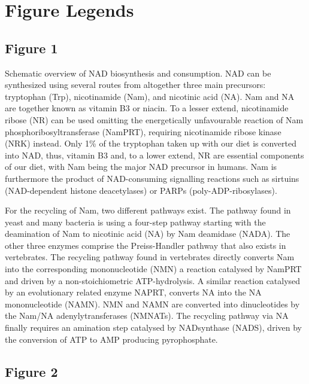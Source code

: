 
\section{Figure Legends}

\subsection{Figure 1}

Schematic overview of NAD biosynthesis and consumption. NAD can be synthesized using several routes from altogether three main precursors: tryptophan (Trp), nicotinamide (Nam), and nicotinic acid (NA). Nam and NA are together known as vitamin B3 or niacin. To a lesser extend, nicotinamide ribose (NR) can be used omitting the energetically unfavourable reaction of Nam phosphoribosyltransferase (NamPRT), requiring nicotinamide ribose kinase (NRK) instead. Only 1\% of the tryptophan taken up with our diet is converted into NAD, thus, vitamin B3 and, to a lower extend, NR are essential components of our diet, with Nam being the major NAD precursor in humans. Nam is furthermore the product of NAD-consuming signalling reactions such as sirtuins (NAD-dependent histone deacetylases) or PARPs (poly-ADP-ribosylases).

For the recycling of Nam, two different pathways exist. The pathway found in yeast and many bacteria is using a four-step pathway starting with the deamination of Nam to nicotinic acid (NA) by Nam deamidase (NADA). The other three enzymes comprise the Preiss-Handler pathway that also exists in vertebrates. The recycling pathway found in vertebrates directly converts Nam into the corresponding mononucleotide (NMN) a reaction catalysed by NamPRT and driven by a non-stoichiometric ATP-hydrolysis. A similar reaction catalysed by an evolutionary related enzyme NAPRT, converts NA into the NA mononucleotide (NAMN). NMN and NAMN are converted into dinucleotides by the Nam/NA adenylytransferases (NMNATs). The recycling pathway via NA finally requires an amination step catalysed by NADsynthase (NADS), driven by the conversion of ATP to AMP producing pyrophosphate.


\subsection{Figure 2}

